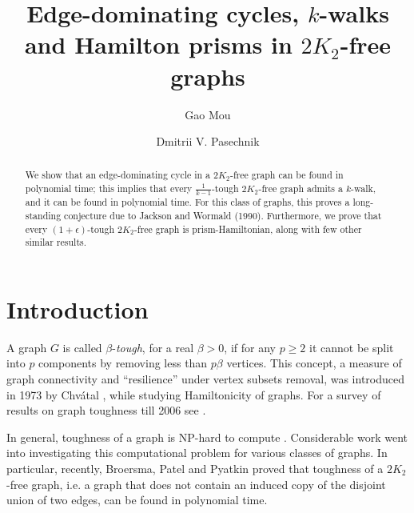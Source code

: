 \documentclass[runningheads,a4paper]{llncs}
\begin{document}
\mainmatter

\title{Edge-dominating cycles, $k$-walks and Hamilton prisms in $2K_2$-free graphs}

\author{Gao Mou \and Dmitrii V. Pasechnik}

\maketitle

\begin{abstract}
We show that an edge-dominating cycle in a $2K_2$-free graph can be found
in polynomial time; this implies that every $\frac{1}{k-1}$-tough
$2K_2$-free graph admits a $k$-walk, and it can be found in polynomial time.
For this class of graphs, this proves a
long-standing conjecture due to Jackson and Wormald (1990).
Furthermore, we prove that every $(1+\epsilon)$-tough $2K_2$-free graph is prism-Hamiltonian,
along with few other similar results.
\end{abstract}


\section{Introduction}
A graph $G$ is called $\beta$-{\em tough}, for a real $\beta>0$, if for any $p\geq 2$ it
cannot be split into $p$ components by removing less than $p\beta$ vertices.  
This concept, a measure of graph connectivity and ``resilience'' under vertex subsets removal,
was introduced in 1973 by Chv\'{a}tal \cite{chvatal1973tough},
while studying   Hamiltonicity of graphs. For a survey of results on graph toughness till 2006
see \cite{MR2221006}. 

In general, toughness of a graph is NP-hard to compute 
\cite{MR1074858}. Considerable work went into investigating this computational problem for
various classes of graphs. In particular, recently, Broersma, Patel and Pyatkin proved
\cite{broersma2014toughness} that toughness of a $2K_2$-free graph, i.e. a graph that
does not contain an induced copy of the disjoint union of two edges,
can be found in polynomial time. 
\end{document}
